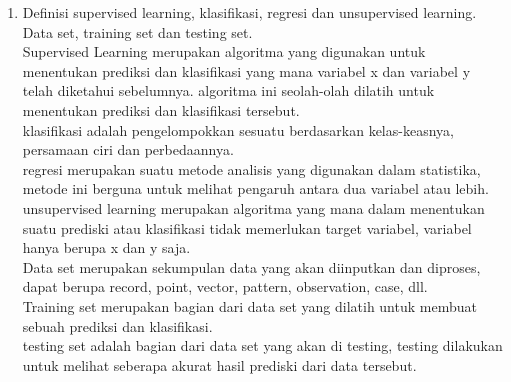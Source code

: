 \begin{enumerate}
\item Definisi supervised learning, klasifikasi, regresi dan unsupervised learning. Data set, training set dan testing set.\\

Supervised Learning merupakan algoritma yang digunakan untuk menentukan prediksi dan klasifikasi yang mana variabel x dan variabel y telah diketahui sebelumnya. algoritma ini seolah-olah dilatih untuk menentukan prediksi dan klasifikasi tersebut.\\

klasifikasi adalah pengelompokkan sesuatu berdasarkan kelas-keasnya, persamaan ciri dan perbedaannya.\\

regresi merupakan suatu metode analisis yang digunakan dalam statistika, metode ini berguna untuk melihat pengaruh antara dua variabel atau lebih.\\

unsupervised learning merupakan algoritma yang mana dalam menentukan suatu prediski atau klasifikasi tidak memerlukan target variabel, variabel hanya berupa x dan y saja.\\

Data set merupakan sekumpulan data yang akan diinputkan dan diproses, dapat berupa record, point, vector, pattern, observation, case, dll.\\

Training set merupakan bagian dari data set yang dilatih untuk membuat sebuah prediksi dan klasifikasi.\\

testing set adalah bagian dari data set yang akan di testing, testing dilakukan untuk melihat seberapa akurat hasil prediski dari data tersebut.\\

\end{enumerate}

